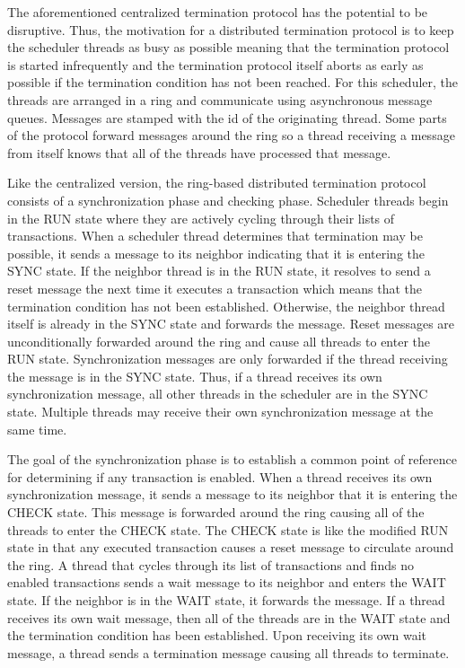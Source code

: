 The aforementioned centralized termination protocol has the potential to be disruptive.
Thus, the motivation for a distributed termination protocol is to keep the scheduler threads as busy as possible meaning that the termination protocol is started infrequently and the termination protocol itself aborts as early as possible if the termination condition has not been reached.
For this scheduler, the threads are arranged in a ring and communicate using asynchronous message queues.
Messages are stamped with the id of the originating thread.
Some parts of the protocol forward messages around the ring so a thread receiving a message from itself knows that all of the threads have processed that message.

Like the centralized version, the ring-based distributed termination protocol consists of a synchronization phase and checking phase.
Scheduler threads begin in the RUN state where they are actively cycling through their lists of transactions.
When a scheduler thread determines that termination may be possible, it sends a message to its neighbor indicating that it is entering the SYNC state.
If the neighbor thread is in the RUN state, it resolves to send a reset message the next time it executes a transaction which means that the termination condition has not been established.
Otherwise, the neighbor thread itself is already in the SYNC state and forwards the message.
Reset messages are unconditionally forwarded around the ring and cause all threads to enter the RUN state.
Synchronization messages are only forwarded if the thread receiving the message is in the SYNC state.
Thus, if a thread receives its own synchronization message, all other threads in the scheduler are in the SYNC state.
Multiple threads may receive their own synchronization message at the same time.

The goal of the synchronization phase is to establish a common point of reference for determining if any transaction is enabled.
When a thread receives its own synchronization message, it sends a message to its neighbor that it is entering the CHECK state.
This message is forwarded around the ring causing all of the threads to enter the CHECK state.
The CHECK state is like the modified RUN state in that any executed transaction causes a reset message to circulate around the ring.
A thread that cycles through its list of transactions and finds no enabled transactions sends a wait message to its neighbor and enters the WAIT state.
If the neighbor is in the WAIT state, it forwards the message.
If a thread receives its own wait message, then all of the threads are in the WAIT state and the termination condition has been established.
Upon receiving its own wait message, a thread sends a termination message causing all threads to terminate.

